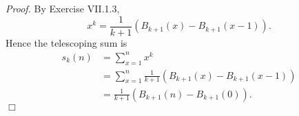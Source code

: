 \documentclass{article}
\begin{document}
\emph{Proof.}
  By Exercise VII.1.3,
  \[
    x^k = \frac{1}{k+1} (B_{k+1}(x) - B_{k+1}(x-1)).
  \]
  Hence the telescoping sum is
  \begin{align*}
     s_k(n)
     &= \sum_{x=1}^{n} x^k \\
     &= \sum_{x=1}^{n} \frac{1}{k+1} (B_{k+1}(x) - B_{k+1}(x-1)) \\
     &= \frac{1}{k+1} (B_{k+1}(n) - B_{k+1}(0)).
  \end{align*}
$\Box$ \\\\



\end{document}
